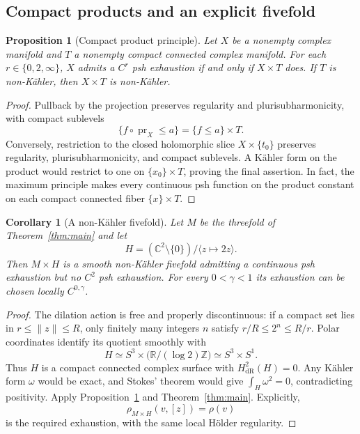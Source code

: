 \documentclass[11pt]{amsart}
\newtheorem{proposition}[theorem]{Proposition}
\newtheorem{corollary}[theorem]{Corollary}
\theoremstyle{definition}
\theoremstyle{remark}
\numberwithin{equation}{section}
\newcommand{\C}{\mathbb C}
\newcommand{\R}{\mathbb R}
\begin{document}
\subsection{Compact products and an explicit fivefold}\label{sec:products}

\begin{proposition}[Compact product principle]\label{prop:compact-product}
Let $X$ be a nonempty complex manifold and $T$ a nonempty compact
connected complex manifold.  For each $r\in\{0,2,\infty\}$, $X$
admits a $C^r$ psh exhaustion if and only if $X\times T$ does.  If
$T$ is non-K\"ahler, then $X\times T$ is non-K\"ahler.
\end{proposition}

\begin{proof}
Pullback by the projection preserves regularity and
plurisubharmonicity, with compact sublevels
\begin{equation}\label{eq:product-sublevels}
 \{f\circ\operatorname{pr}_X\le a\}=\{f\le a\}\times T.
\end{equation}
Conversely, restriction to the closed holomorphic slice
$X\times\{t_0\}$ preserves regularity, plurisubharmonicity, and
compact sublevels.  A K\"ahler form on the product would restrict to
one on $\{x_0\}\times T$, proving the final assertion.  In fact, the
maximum principle makes every continuous psh function on the product
constant on each compact connected fiber $\{x\}\times T$.
\end{proof}

\begin{corollary}[A non-K\"ahler fivefold]\label{cor:nonkahler}
Let $M$ be the threefold of Theorem~\ref{thm:main} and let
\begin{equation}\label{eq:hopf-surface}
 H=(\C^2\setminus\{0\})/\langle z\mapsto2z\rangle.
\end{equation}
Then $M\times H$ is a smooth non-K\"ahler fivefold admitting a
continuous psh exhaustion but no $C^2$ psh exhaustion.  For every
$0<\gamma<1$ its exhaustion can be chosen locally $C^{0,\gamma}$.
\end{corollary}

\begin{proof}
The dilation action is free and properly discontinuous: if a compact
set lies in $r\le\|z\|\le R$, only finitely many integers $n$ satisfy
$r/R\le2^n\le R/r$.  Polar coordinates identify its quotient smoothly
with
\begin{equation}\label{eq:hopf-topology}
 H\simeq S^3\times\bigl(\R/(\log2)\mathbb Z\bigr)
 \simeq S^3\times S^1.
\end{equation}
Thus $H$ is a compact connected complex surface with
$H^2_{\mathrm{dR}}(H)=0$.  Any K\"ahler form $\omega$ would be exact,
and Stokes' theorem would give $\int_H\omega^2=0$, contradicting
positivity.  Apply Proposition~\ref{prop:compact-product} and
Theorem~\ref{thm:main}.  Explicitly,
\begin{equation}\label{eq:nonkahler-exhaustion}
 \rho_{M\times H}(v,[z])=\rho(v)
\end{equation}
is the required exhaustion, with the same local H\"older regularity.
\end{proof}
\end{document}
